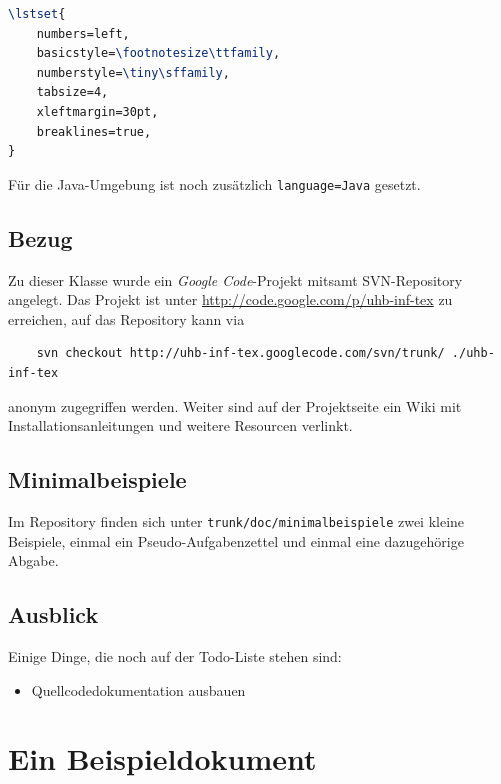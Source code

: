 \documentclass[palatino,gruppe-aus,semester-aus,veranstaltung-aus,abgabe-aus,tutor-aus,utf]{../cls/uhb-inf}
\begin{document}
\begin{lstlisting}[language=tex]
\lstset{
	numbers=left,
	basicstyle=\footnotesize\ttfamily,
	numberstyle=\tiny\sffamily,
	tabsize=4,
	xleftmargin=30pt,
	breaklines=true,
}
\end{lstlisting}

Für die Java-Umgebung ist noch zusätzlich \texttt{language=Java} gesetzt.

\subsection{Bezug}

Zu dieser Klasse wurde ein \textit{Google Code}-Projekt mitsamt SVN-Repository angelegt. Das Projekt ist unter \url{http://code.google.com/p/uhb-inf-tex} zu erreichen, auf das Repository kann via

\begin{verbatim}
    svn checkout http://uhb-inf-tex.googlecode.com/svn/trunk/ ./uhb-inf-tex
\end{verbatim}

anonym zugegriffen werden. Weiter sind auf der Projektseite ein Wiki mit Installationsanleitungen und weitere Resourcen verlinkt.

\subsection{Minimalbeispiele}

Im Repository finden sich unter \texttt{trunk/doc/minimalbeispiele} zwei kleine Beispiele, einmal ein Pseudo-Aufgabenzettel und einmal eine dazugehörige Abgabe.

\subsection{Ausblick}

Einige Dinge, die noch auf der Todo-Liste stehen sind:

\begin{itemize}
	\item Quellcodedokumentation ausbauen
\end{itemize}

\section{Ein Beispieldokument}
\end{document}
